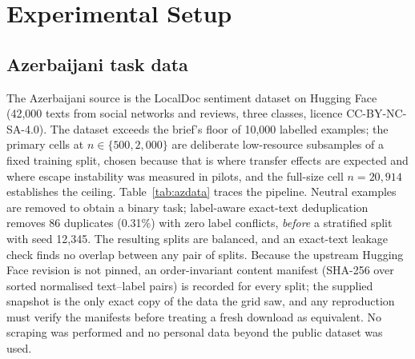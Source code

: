 \section{Experimental Setup}
\label{sec:setup}

\subsection{Azerbaijani task data}
\label{sec:setup:data}
The Azerbaijani source is the LocalDoc sentiment dataset on Hugging Face \cite{localdoc2024sentiment} (42{,}000 texts from social networks and reviews, three classes, licence CC-BY-NC-SA-4.0). The dataset exceeds the brief's floor of 10{,}000 labelled examples; the primary cells at $n\in\{500,2{,}000\}$ are deliberate low-resource subsamples of a fixed training split, chosen because that is where transfer effects are expected and where escape instability was measured in pilots, and the full-size cell $n=20{,}914$ establishes the ceiling. Table~\ref{tab:azdata} traces the pipeline. Neutral examples are removed to obtain a binary task; label-aware exact-text deduplication removes 86 duplicates (0.31\%) with zero label conflicts, \emph{before} a stratified split with seed 12{,}345. The resulting splits are balanced, and an exact-text leakage check finds no overlap between any pair of splits. Because the upstream Hugging Face revision is not pinned, an order-invariant content manifest (SHA-256 over sorted normalised text–label pairs) is recorded for every split; the supplied  snapshot is the only exact copy of the data the grid saw, and any reproduction must verify the manifests before treating a fresh download as equivalent. No scraping was performed and no personal data beyond the public dataset was used.

